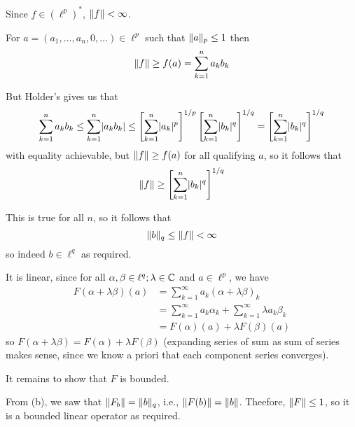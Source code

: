 \documentclass[a4paper, 10pt]{article}
\begin{document}
\begin{solution}
    Since $f \in (\ell^p)^*$, $\lVert f\rVert < \infty$.

    For $a = (a_1, \ldots, a_n, 0, \ldots) \in \ell^p$ such that $\lVert a\rVert_p \leq 1$ then 
    \begin{equation*}
    \lVert f\rVert \geq f(a) = \sum_{k=1}^{n} a_k b_k
    \end{equation*}

    But Holder's gives us that \begin{equation*}
        \sum_{k=1}^{n} a_k b_k \leq \sum_{k=1}^{n} \lvert a_k b_k\rvert \leq \left[\sum_{k=1}^{n} \lvert a_k\rvert^p\right]^{1/p}  \left[\sum_{k=1}^{n} \lvert b_k\rvert^q\right]^{1/q} =\left[\sum_{k=1}^{n} \lvert b_k\rvert^q\right]^{1/q} 
    \end{equation*}
    with equality achievable, but $\lVert f\rVert \geq f(a)$ for all qualifying $a$, so it follows that \begin{equation*}
        \lVert f\rVert \geq \left[\sum_{k=1}^{n} \lvert b_k\rvert^q\right]^{1/q}
    \end{equation*}

    This is true for all $n$, so it follows that \begin{equation*}
    \lVert b\rVert_q \leq \lVert f\rVert < \infty
    \end{equation*}
    so indeed $b \in \ell^q$ as required.
    
    It is linear, since for all $\alpha, \beta \in \ell^q; \lambda \in \mathbb{C}$ and $a \in \ell^p$, we have
    \begin{align*}
    F (\alpha + \lambda \beta) (a) &= \sum_{k=1}^{\infty} a_k (\alpha + \lambda \beta)_k \\
    &= \sum_{k=1}^{\infty} a_k \alpha_k + \sum_{k=1}^{\infty} \lambda a_k \beta_k \\
    &= F(\alpha)(a) + \lambda F(\beta)(a)
    \end{align*}
    so $F(\alpha + \lambda \beta) = F(\alpha) + \lambda F(\beta)$ (expanding series of sum as sum of series makes sense, since we know a priori that each component series converges).

    It remains to show that $F$ is bounded.

    From (b), we saw that $\lVert F_b\rVert = \lVert b\rVert_q$, i.e., $\lVert F(b)\rVert = \lVert b\rVert$. Theefore, $\lVert F\rVert \leq 1$, so it is a bounded linear operator as required.
\end{solution}
\end{document}

